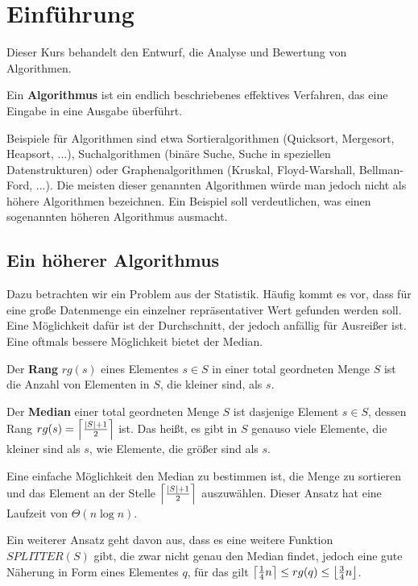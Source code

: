 %
%
%
\section{Einführung}

Dieser Kurs behandelt den Entwurf, die Analyse und Bewertung von Algorithmen.

Ein \textbf{Algorithmus} ist ein endlich beschriebenes effektives Verfahren,
das eine Eingabe in eine Ausgabe überführt.

Beispiele für Algorithmen sind etwa Sortieralgorithmen
(Quicksort,
Mergesort,
Heapsort,
...),
Suchalgorithmen (binäre Suche,
Suche in speziellen Datenstrukturen)
oder Graphenalgorithmen
(Kruskal,
Floyd-Warshall,
Bellman-Ford,
...).
Die meisten dieser genannten Algorithmen würde man jedoch nicht als höhere
Algorithmen bezeichnen. Ein Beispiel soll verdeutlichen, was einen sogenannten
höheren Algorithmus ausmacht.

\subsection{Ein höherer Algorithmus}

Dazu betrachten wir ein Problem aus der Statistik.
Häufig kommt es vor, dass für eine große Datenmenge ein einzelner repräsentativer Wert gefunden werden soll.
Eine Möglichkeit dafür ist der Durchschnitt, der jedoch anfällig für Ausreißer ist.
Eine oftmals bessere Möglichkeit bietet der Median.

Der \textbf{Rang} $rg(s)$ eines Elementes $s \in S$
in einer total geordneten Menge $S$ ist die Anzahl von Elementen in $S$,
die kleiner sind, als $s$.

Der \textbf{Median} einer total geordneten Menge $S$ ist dasjenige Element $s \in S$,
dessen Rang $rg(s) = \left\lceil{\frac{\left|S\right|+1}{2}}\right\rceil$ ist.
Das heißt, es gibt in $S$ genauso viele Elemente, die kleiner sind als $s$,
wie Elemente, die größer sind als $s$.

Eine einfache Möglichkeit den Median zu bestimmen ist,
die Menge zu sortieren und das Element an der Stelle $\left\lceil{\frac{\left|S\right|+1}{2}}\right\rceil$ auszuwählen.
Dieser Ansatz hat eine Laufzeit von $\Theta(n \log n)$.

Ein weiterer Ansatz geht davon aus, dass es eine weitere Funktion $SPLITTER(S)$ gibt,
die zwar nicht genau den Median findet, jedoch eine gute Näherung in Form eines Elementes $q$,
für das gilt $\left\lceil{\frac{1}{4} n}\right\rceil \leq rg(q) \leq \left\lfloor{\frac{3}{4} n}\right\rfloor$.

